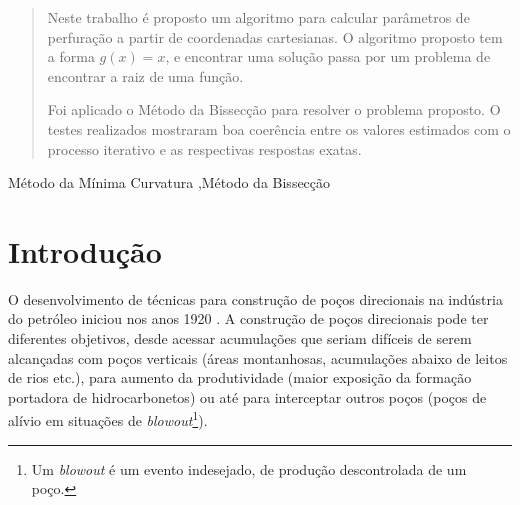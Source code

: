 \documentclass[final,5p]{elsarticle}
\numberwithin{equation}{section}
\begin{document}
\begin{frontmatter}
\begin{abstract}
    Neste trabalho é proposto um algoritmo para calcular parâmetros de perfuração a partir de coordenadas cartesianas. O algoritmo proposto tem a forma $g(x)=x$, e encontrar uma solução passa por um problema de encontrar a raiz de uma função. 

    Foi aplicado o Método da Bissecção para resolver o problema proposto. O testes realizados mostraram boa coerência entre os valores estimados com o processo iterativo e as respectivas respostas exatas.

\end{abstract}



\begin{keyword}
    Método da Mínima Curvatura \sep Método da Bissecção 



\end{keyword}

\end{frontmatter}


\section{Introdução}

O desenvolvimento de técnicas para construção de poços direcionais na indústria do petróleo iniciou nos anos 1920 \cite{international2015iadc}. A construção de poços direcionais pode ter diferentes objetivos, desde acessar acumulações que seriam difíceis de serem alcançadas com poços verticais (áreas montanhosas, acumulações abaixo de leitos de rios etc.), para aumento da produtividade (maior exposição da formação portadora de hidrocarbonetos) ou até para interceptar outros poços (poços de alívio em situações de \emph{blowout}\footnote{Um \emph{blowout} é um evento indesejado, de produção descontrolada de um poço.}).
\end{document}
